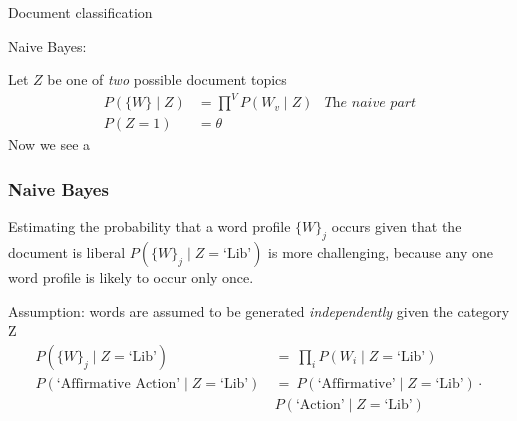 \documentclass{hertieteaching}
\begin{document}
\begin{frame}{Document classification}

Naive Bayes:

Let $Z$ be one of \textit{two} possible document topics
\begin{align*}
P(\{W\} \mid Z) & = \prod^V P(W_v \mid Z) & \textit{The naive part}\\
P(Z=1) & = \theta
\end{align*}
Now we see a 
  
\end{frame}

\begin{frame}[t,fragile]\frametitle{Naive Bayes}

Estimating the probability that a word profile $\{W\}_j$ occurs given that the document is liberal $P(\{W\}_j\mid Z=\text{`Lib'})$ is more challenging, because any one word profile is likely to occur only once.

Assumption: words are assumed to be generated \textit{independently} given the category Z
\begin{align*}
P(\{W\}_j \mid Z=\text{`Lib'}) &~=~ {\prod}_i P(W_i \mid Z=\text{`Lib'})\\
P( \text{`Affirmative Action'} \mid Z=\text{`Lib'}) &~=~ P( \text{`Affirmative'} \mid Z=\text{`Lib'}) \cdot\\
& ~  P( \text{`Action'} \mid Z=\text{`Lib'})
\end{align*}


\end{frame}
\end{document}
